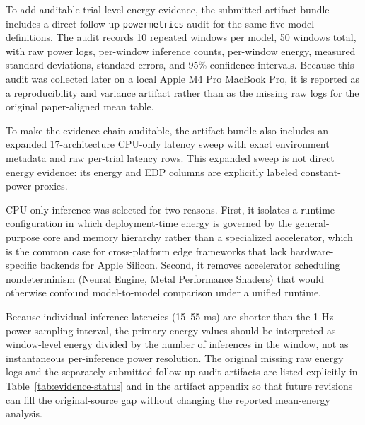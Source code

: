 \documentclass{svproc}
\begin{document}
To add auditable trial-level energy evidence, the submitted artifact bundle
includes a direct follow-up \texttt{powermetrics} audit for the same five
model definitions. The audit records 10 repeated windows per model, 50 windows
total, with raw power
logs, per-window inference counts, per-window energy, measured standard
deviations, standard errors, and 95\% confidence intervals. Because this audit
was collected later on a local Apple M4 Pro MacBook Pro, it is reported as a
reproducibility and variance artifact rather than as the missing raw logs for
the original paper-aligned mean table.

To make the evidence chain auditable, the artifact bundle also includes an expanded
17-architecture CPU-only latency sweep with exact environment metadata and raw
per-trial latency rows. This expanded sweep is not direct energy evidence:
its energy and EDP columns are explicitly labeled constant-power proxies.

CPU-only inference was selected for two reasons. First, it isolates a runtime
configuration in which deployment-time energy is governed by the general-purpose
core and memory hierarchy rather than a specialized accelerator, which is the
common case for cross-platform edge frameworks that lack hardware-specific
backends for Apple Silicon. Second, it removes accelerator scheduling
nondeterminism (Neural Engine, Metal Performance Shaders) that would otherwise
confound model-to-model comparison under a unified runtime.

Because individual inference latencies (15--55 ms) are shorter than the 1 Hz
power-sampling interval, the primary energy values should be interpreted as
window-level energy divided by the number of inferences in the window, not as
instantaneous per-inference power resolution. The original missing raw energy
logs and the separately submitted follow-up audit artifacts are listed
explicitly in Table~\ref{tab:evidence-status} and in the artifact
appendix so that future revisions can fill the original-source gap without
changing the reported mean-energy analysis.
\end{document}
